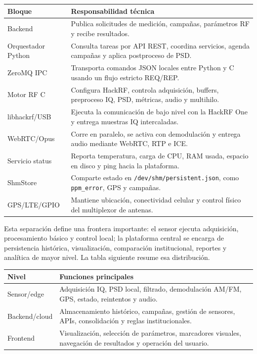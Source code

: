 \begin{center}
\begin{tabular}{p{}p{}}
\toprule
\textbf{Bloque} & \textbf{Responsabilidad técnica} \\
\midrule
Backend & Publica solicitudes de medición, campañas, parámetros RF y recibe resultados. \\
Orquestador Python & Consulta tareas por API REST, coordina servicios, agenda campañas y aplica postproceso de PSD. \\
ZeroMQ IPC & Transporta comandos JSON locales entre Python y C usando un flujo estricto REQ/REP. \\
Motor RF C & Configura HackRF, controla adquisición, buffers, preproceso IQ, PSD, métricas, audio y multihilo. \\
libhackrf/USB & Ejecuta la comunicación de bajo nivel con la HackRF One y entrega muestras IQ intercaladas. \\
WebRTC/Opus & Corre en paralelo, se activa con demodulación y entrega audio mediante WebRTC, RTP e ICE. \\
Servicio status & Reporta temperatura, carga de CPU, RAM usada, espacio en disco y ping hacia la plataforma. \\
ShmStore & Comparte estado en \texttt{/dev/shm/persistent.json}, como \texttt{ppm\_error}, GPS y campañas. \\
GPS/LTE/GPIO & Mantiene ubicación, conectividad celular y control físico del multiplexor de antenas. \\
\bottomrule
\end{tabular}
\end{center}

Esta separación define una frontera importante: el sensor ejecuta adquisición,
procesamiento básico y control local; la plataforma central se encarga de
persistencia histórica, visualización, comparación institucional, reportes y
analítica de mayor nivel. La tabla siguiente resume esa distribución.

\begin{center}
\begin{tabular}{p{}p{}}
\toprule
\textbf{Nivel} & \textbf{Funciones principales} \\
\midrule
Sensor/edge & Adquisición IQ, PSD local, filtrado, demodulación AM/FM, GPS, estado, reintentos y audio. \\
Backend/cloud & Almacenamiento histórico, campañas, gestión de sensores, APIs, consolidación y reglas institucionales. \\
Frontend & Visualización, selección de parámetros, marcadores visuales, navegación de resultados y operación del usuario. \\
\bottomrule
\end{tabular}
\end{center}


